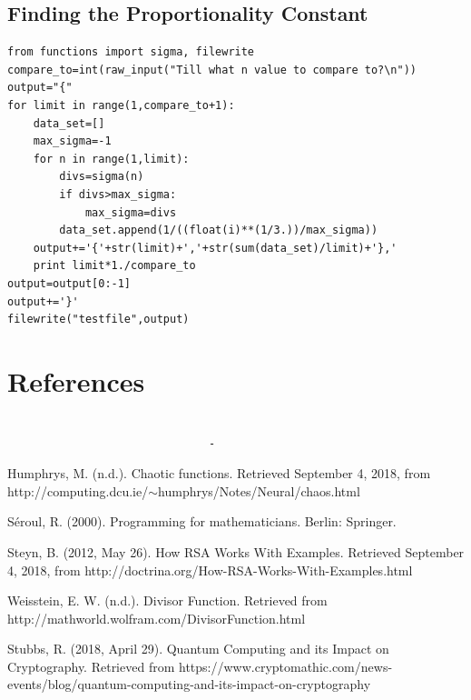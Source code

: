 \documentclass[12pt]{article}
\begin{document}
			\subsection{Finding the Proportionality Constant\label{coProp}}
				\begin{verbatim}
from functions import sigma, filewrite
compare_to=int(raw_input("Till what n value to compare to?\n"))
output="{"
for limit in range(1,compare_to+1):
    data_set=[]
    max_sigma=-1
    for n in range(1,limit):
        divs=sigma(n)
        if divs>max_sigma:
            max_sigma=divs
        data_set.append(1/((float(i)**(1/3.))/max_sigma))
    output+='{'+str(limit)+','+str(sum(data_set)/limit)+'},'
    print limit*1./compare_to
output=output[0:-1]
output+='}'
filewrite("testfile",output)
				\end{verbatim}
\newpage
	\section{References}
		\texttt{\ \ \ \ \ \ \ \ \ \ \ \ \ \ \ \ \ \ \ \ \ \ \ \ \ \ \ \ \ \ \ \ \ \ \ \ \ \ \ \ \ \ \ \ \ \ \ \ \ \ \ \ \ \ \ \ \ \ \ \ \ \ \ \ \ \ \ \ \ \ \ \ \ \ \ \ \ \ \ \ \ \ \ \ \ \ \ \ \ \ \ \ \ \ \ \ \ \ \ \ \ -}

		Humphrys, M. (n.d.). Chaotic functions. Retrieved September 4, 2018, from http://computing.dcu.ie/$\sim$humphrys/Notes/Neural/chaos.html

		\vspace{1cm}

		S\'eroul, R. (2000). Programming for mathematicians. Berlin: Springer.

		\vspace{1cm}

		Steyn, B. (2012, May 26). How RSA Works With Examples. Retrieved September 4, 2018, from http://doctrina.org/How-RSA-Works-With-Examples.html

		\vspace{1cm}

		Weisstein, E. W. (n.d.). Divisor Function. Retrieved from \\http://mathworld.wolfram.com/DivisorFunction.html

		\vspace{1cm}

		Stubbs, R. (2018, April 29). Quantum Computing and its Impact on Cryptography. Retrieved from https://www.cryptomathic.com/news-events/blog/quantum-computing-and-its-impact-on-cryptography
\end{document}
